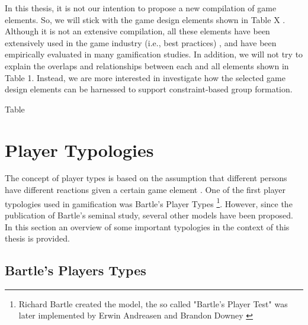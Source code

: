In this thesis, it is not our intention to propose a new compilation of game elements. So, we will stick with the game design elements shown in Table X . Although it is not an extensive compilation, all these elements have been extensively used in the game industry (i.e., best practices) \cite{ferro2016gamification}, and have been empirically evaluated in many gamification studies\cite{Sailer2017}. In addition, we will not try to explain the overlaps and relationships between each and all elements shown in Table 1. Instead, we are more interested in investigate how the selected game design elements can be harnessed to support constraint-based group formation.

Table 

\section{Player Typologies}
\label{sec:Player_Typologies}

The concept of player types is based on the assumption that different persons have different reactions given a certain game element \cite{fullerton2008}.
One of the first player typologies used in gamification was Bartle's Player Types \footnote{Richard Bartle created the model, the so called "Bartle's Player Test" was later implemented by Erwin Andreasen and Brandon Downey \cite{Bartle2009}}. However, since the publication of Bartle's seminal study, several other models have been proposed. In this section an overview of some important typologies in the context of this thesis is provided. 

\subsection{Bartle's Players Types}
\label{sec:Bartle_Players_Types}

